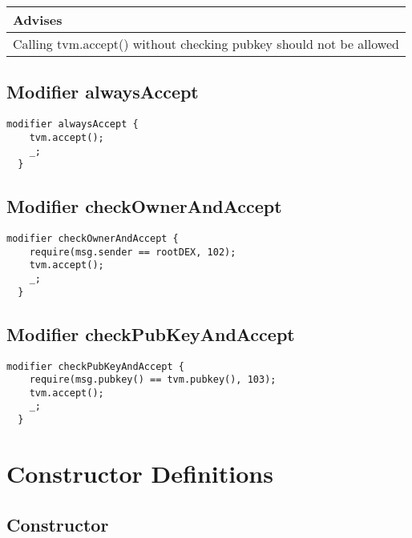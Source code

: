 \ifsoldraft
\noindent\begin{tabular}{|p{12cm}|}\hline
\rowcolor{green}Advises
\\\hline
Calling tvm.accept() without checking pubkey should not be allowed
\\\hline\end{tabular}
\fi

\subsection{Modifier alwaysAccept}


\begin{lstlisting}[firstnumber=71]
  modifier alwaysAccept {
    tvm.accept();
    _;
  }
\end{lstlisting}

\subsection{Modifier checkOwnerAndAccept}


\begin{lstlisting}[firstnumber=76]
  modifier checkOwnerAndAccept {
    require(msg.sender == rootDEX, 102);
    tvm.accept();
    _;
  }
\end{lstlisting}

\subsection{Modifier checkPubKeyAndAccept}


\begin{lstlisting}[firstnumber=82]
  modifier checkPubKeyAndAccept {
    require(msg.pubkey() == tvm.pubkey(), 103);
    tvm.accept();
    _;
  }
\end{lstlisting}

\section{Constructor Definitions}


\subsection{Constructor}


